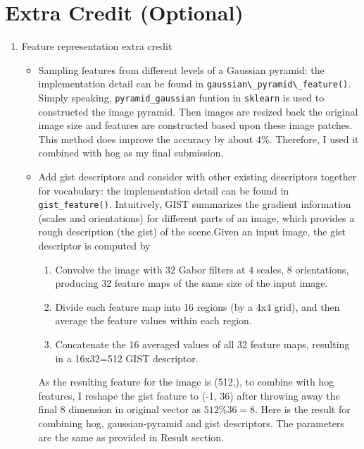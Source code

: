 \section*{Extra Credit (Optional)}
\begin{enumerate}
    \item Feature representation extra credit
          \begin{itemize}
              \item Sampling features from different levels of a Gaussian pyramid: the implementation detail can be found in \verb|gaussian\_pyramid\_feature()|. Simply speaking, \verb|pyramid_gaussian| funtion in \verb|sklearn| is used to constructed the image pyramid. Then images are resized back the original image size and features are constructed based upon these image patches. This method does improve the accuracy by about 4\%. Therefore, I used it combined with hog as my final submission.
              \item Add gist descriptors and consider with other existing descriptors together for vocabulary: the implementation detail can be found in \verb|gist_feature()|. Intuitively, GIST summarizes the gradient information (scales and orientations) for different parts of an image, which provides a rough description (the gist) of the scene.Given an input image, the gist descriptor is computed by
                    \begin{enumerate}
                        \item Convolve the image with 32 Gabor filters at 4 scales, 8 orientations, producing 32 feature maps of the same size of the input image.
                        \item Divide each feature map into 16 regions (by a 4x4 grid), and then average the feature values within each region.
                        \item Concatenate the 16 averaged values of all 32 feature maps, resulting in a 16x32=512 GIST descriptor.
                    \end{enumerate}
                    As the resulting feature for the image is (512,), to combine with hog features, I reshape the gist feature to (-1, 36) after throwing away the final 8 dimension in original vector as $512 \% 36=8$. Here is the result for combining hog, gaussian-pyramid and gist descriptors. The parameters are the same as provided in Result section.
                    \begin{table}[h]
                        \centering
                        \begin{tabular}{lr}

\end{tabular}
\end{table}
\end{itemize}
\end{enumerate}

